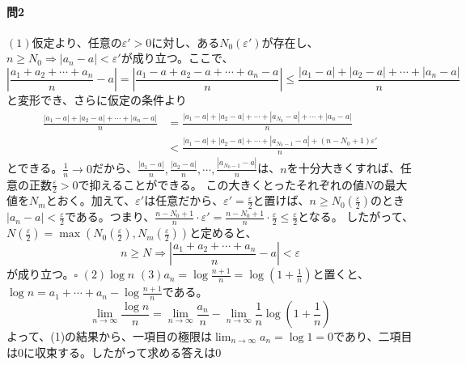 \documentclass[a4j,dvipdfmx]{jsarticle}
\begin{document}
                \paragraph{問2}$(1)$仮定より、任意の$\varepsilon'>0$に対し、ある$N_0(\varepsilon')$が存在し、$n\geq N_0\Rightarrow |a_n-a|<\varepsilon'$が成り立つ。ここで、
                    \begin{equation*}
                        \left|\frac{a_1+a_2+\cdots+a_n}{n}-a\right|=\left|\frac{a_1-a+a_2-a+\cdots+a_n-a}{n}\right|\leq \frac{|a_1-a|+|a_2-a|+\cdots+|a_n-a|}{n}
                    \end{equation*}
                    と変形でき、さらに仮定の条件より
                    \begin{align*}
                        \frac{|a_1-a|+|a_2-a|+\cdots+|a_n-a|}{n}&=\frac{|a_1-a|+|a_2-a|+\cdots+|a_{N_0}-a|+\cdots+|a_n-a|}{n}\\ &<\frac{|a_1-a|+|a_2-a|+\cdots+|a_{N_0-1}-a|+(n-N_0+1)\varepsilon'}{n}
                    \end{align*}
                    とできる。$\frac{1}{n}\to 0$だから、$\displaystyle \frac{|a_1-a|}{n},\frac{|a_2-a|}{n},\cdots,\frac{|a_{N_0-1}-a|}{n}$は、$n$を十分大きくすれば、任意の正数$\frac{\varepsilon}{2}>0$で抑えることができる。
                    この大きくとったそれぞれの値$N$の最大値を$N_m$とおく。加えて、$\varepsilon'$は任意だから、$\varepsilon'=\frac{\varepsilon}{2}$と置けば、$n\geq N_0\left(\frac{\varepsilon}{2}\right)$のとき
                    $|a_n-a|<\frac{\varepsilon}{2}$である。つまり、$\displaystyle \frac{n-N_0+1}{n}\cdot \varepsilon'=\frac{n-N_0+1}{n}\cdot \frac{\varepsilon}{2}\leq \frac{\varepsilon}{2}$となる。
                    したがって、$N(\frac{\varepsilon}{2})=\max(N_0(\frac{\varepsilon}{2}),N_m(\frac{\varepsilon}{2}))$と定めると、
                    \begin{equation*}
                        n\geq N \Rightarrow \left|\frac{a_1+a_2+\cdots+a_n}{n}-a\right|<\varepsilon
                    \end{equation*}
                    が成り立つ。$\square$\hspace{1mm}
                    $(2)\log n$\hspace{1mm}
                    $(3)a_n=\log\frac{n+1}{n}=\log(1+\frac{1}{n})$と置くと、$\log n = a_1+\cdots+a_n - \log\frac{n+1}{n}$である。
                    \begin{equation*}
                        \lim_{n\to\infty}\frac{\log n}{n} = \lim_{n\to\infty}\frac{a_n}{n}-\lim_{n\to\infty}\frac{1}{n}\log\left(1+\frac{1}{n}\right)
                    \end{equation*}
                    よって、(1)の結果から、一項目の極限は$\lim_{n\to\infty}a_n = \log 1 =0$であり、二項目は$0$に収束する。したがって求める答えは$0$
                
\end{document}
